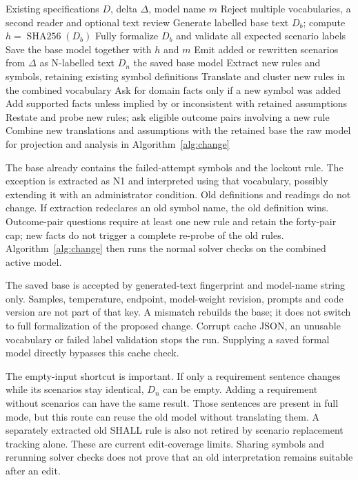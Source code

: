 \begin{algorithm}[H]
\caption{Translate changed scenarios against a saved base}\label{alg:incremental}
\begin{algorithmic}[1]
\Require Existing specifications $D$, delta $\Delta$, model name $m$
\State Reject multiple vocabularies, a second reader and optional text review
\State Generate labelled base text $D_b$; compute $h=\operatorname{SHA256}(D_b)$
  \State Fully formalize $D_b$ and validate all expected scenario labels
  \State Save the base model together with $h$ and $m$
\EndIf
\State Emit added or rewritten scenarios from $\Delta$ as N-labelled text $D_n$
 \State \Return the saved base model \EndIf
\State Extract new rules and symbols, retaining existing symbol definitions
\State Translate and cluster new rules in the combined vocabulary
\State Ask for domain facts only if a new symbol was added
\State Add supported facts unless implied by or inconsistent with retained assumptions
\State Restate and probe new rules; ask eligible outcome pairs involving a new rule
\State Combine new translations and assumptions with the retained base
\State \Return the raw model for projection and analysis in Algorithm~\ref{alg:change}
\end{algorithmic}
\end{algorithm}

The base already contains the failed-attempt symbols and the lockout rule.
The exception is extracted as N1 and interpreted using that vocabulary,
possibly extending it with an administrator condition. Old definitions and
readings do not change. If extraction redeclares an old symbol name, the
old definition wins. Outcome-pair questions require at least one new rule
and retain the forty-pair cap; new facts do not trigger a complete re-probe
of the old rules. Algorithm~\ref{alg:change} then runs the normal solver checks
on the combined active model.

The saved base is accepted by generated-text fingerprint and model-name
string only. Samples, temperature, endpoint, model-weight revision, prompts
and code version are not part of that key. A mismatch rebuilds the base;
it does not switch to full formalization of the proposed change. Corrupt
cache JSON, an unusable vocabulary or failed label validation stops the run.
Supplying a saved formal model directly bypasses this cache check.

The empty-input shortcut is important. If only a requirement sentence
changes while its scenarios stay identical, $D_n$ can be empty. Adding a
requirement without scenarios can have the same result. Those sentences
are present in full mode, but this route can reuse the old model without
translating them. A separately extracted old SHALL rule is also not retired
by scenario replacement tracking alone. These are current edit-coverage
limits. Sharing symbols and rerunning solver checks does not prove that an
old interpretation remains suitable after an edit.
